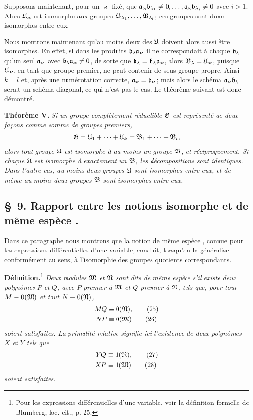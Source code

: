 Supposons maintenant, pour un $\varkappa$ fixé, que $\mathfrak{a}_\varkappa\mathfrak{b}_{\lambda_1}\ne0,\ldots,\mathfrak{a}_\varkappa\mathfrak{b}_{\lambda_i}\ne0$ avec $i>1$. Alors $\mathfrak{U}_\varkappa$ est isomorphe aux groupes $\mathfrak{B}_{\lambda_1},\ldots,\mathfrak{B}_{\lambda_i}$; ces groupes sont donc isomorphes entre eux.

Nous montrons maintenant qu'au moins deux des $\mathfrak{U}$ doivent alors aussi être isomorphes. En effet, si dans les produits $\mathfrak{b}_\lambda\mathfrak{a}_\varkappa$ il ne correspondait à chaque $\mathfrak{b}_\lambda$ qu'un seul $\mathfrak{a}_\varkappa$ avec $\mathfrak{b}_\lambda\mathfrak{a}_\varkappa\ne0$, de sorte que $\mathfrak{b}_\lambda=\mathfrak{b}_\lambda\mathfrak{a}_\varkappa$, alors $\mathfrak{B}_\lambda=\mathfrak{U}_\varkappa$, puisque $\mathfrak{U}_\varkappa$, en tant que groupe premier, ne peut contenir de sous-groupe propre. Ainsi $k=l$ et, après une numérotation correcte, $\mathfrak{a}_\varkappa=\mathfrak{b}_\varkappa$; mais alors le schéma $\mathfrak{a}_\varkappa\mathfrak{b}_\lambda$ serait un schéma diagonal, ce qui n'est pas le cas. Le théorème suivant est donc démontré.

\textbf{Théorème V.} \emph{Si un groupe complètement réductible $\mathfrak{G}$ est représenté de deux façons comme somme de groupes premiers,
\[
 \mathfrak{G}=\mathfrak{U}_1+\cdots+\mathfrak{U}_k=\mathfrak{B}_1+\cdots+\mathfrak{B}_l,
\]
alors tout groupe $\mathfrak{U}$ est isomorphe à au moins un groupe $\mathfrak{B}$, et réciproquement. Si chaque $\mathfrak{U}$ est isomorphe à exactement un $\mathfrak{B}$, les décompositions sont identiques. Dans l'autre cas, au moins deux groupes $\mathfrak{U}$ sont isomorphes entre eux, et de même au moins deux groupes $\mathfrak{B}$ sont isomorphes entre eux.}

\subsection*{\S~9. Rapport entre les notions \og{} isomorphe \fg{} et \og{} de même espèce \fg{}.}

Dans ce paragraphe nous montrons que la notion \og{} de même espèce \fg{}, connue pour les expressions différentielles d'une variable, conduit, lorsqu'on la généralise conformément au sens, à l'isomorphie des groupes quotients correspondants.

\textbf{Définition.}\footnote{Pour les expressions différentielles d'une variable, voir la définition formelle de Blumberg, loc. cit., p. 25.} \emph{Deux modules $\mathfrak{M}$ et $\mathfrak{N}$ sont dits de même espèce s'il existe deux polynômes $P$ et $Q$, avec $P$ premier à $\mathfrak{M}$ et $Q$ premier à $\mathfrak{N}$, tels que, pour tout $M\equiv0(\mathfrak{M})$ et tout $N\equiv0(\mathfrak{N})$,}
\begin{align}
 MQ&\equiv0(\mathfrak{N}),\tag{25}\\
 NP&\equiv0(\mathfrak{M})\tag{26}
\end{align}
\emph{soient satisfaites. La primalité relative signifie ici l'existence de deux polynômes $X$ et $Y$ tels que}
\begin{align}
 YQ&\equiv1(\mathfrak{N}),\tag{27}\\
 XP&\equiv1(\mathfrak{M})\tag{28}
\end{align}
\emph{soient satisfaites.}


